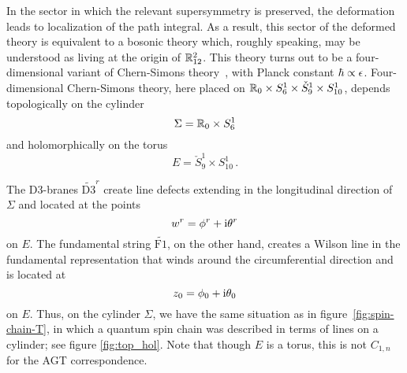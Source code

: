 In the sector in which the relevant supersymmetry is preserved, the
deformation leads to localization of the path integral.  As a result,
this sector of the deformed theory is equivalent to a bosonic theory
which, roughly speaking, may be understood as living at the origin of
$\mathbb{R}^2_{12}$.  This theory turns out to be a four-dimensional variant
of Chern-Simons theory~\cite{Costello:2018txb}, with Planck constant
$\hbar \propto \epsilon$.  Four-dimensional Chern-Simons theory, here
placed on $\mathbb{R}_0 \times S^1_6 \times \check{S}^1_9 \times S^1_{10}$,
depends topologically on the cylinder
\begin{equation}
  \Sigma = \mathbb{R}_0 \times S^1_6
\end{equation}
and holomorphically on the torus
\begin{equation}
  E = \check{S}^1_9 \times S^1_{10} \,.
\end{equation}


The D3-branes $\widetilde{\mathrm{D3}}^r$ create line defects
extending in the longitudinal direction of $\Sigma$ and located at the
points
\begin{equation}
  w^r = \phi^r + \mathrm{i}\theta^r
\end{equation}
on $E$.  The fundamental string $\widetilde{\mathrm{F1}}$, on the
other hand, creates a Wilson line in the fundamental representation that
winds around the circumferential direction and is located at
\begin{equation}
  z_0 = \phi_0 + \mathrm{i}\theta_0
\end{equation}
on $E$.  Thus, on the cylinder $\Sigma$, we have the same situation as
in figure~\ref{fig:spin-chain-T}, in which a quantum spin chain was
described in terms of lines on a cylinder; see figure \ref{fig:top_hol}.
Note that though $E$ is a torus, this is not $C_{1,n}$ for
the AGT correspondence.


